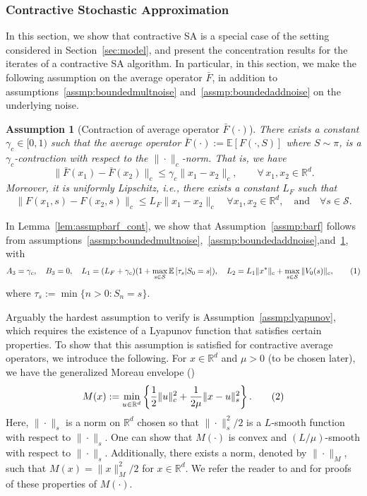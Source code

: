 \documentclass{article}
\newcommand{\numberthis}{\addtocounter{equation}{1}\tag{\theequation}}
\newcommand{\lrset}[1]{\left\{ #1 \right\}}
\newcommand{\lrs}[1]{\left[ #1 \right]}
\newcommand{\E}[1]{\mathbb{E}\lrs{#1}}
\newcommand{\R}{\mathbb{R}}
\newtheorem{assmp}{Assumption}
\begin{document}
\subsubsection{Contractive Stochastic Approximation}\label{sec:contractiveSA}
In this section, we show that contractive SA is a special case of the setting considered in Section~\ref{sec:model}, and present the concentration results for the iterates of a contractive SA algorithm. In particular, in this section, we make the following assumption on the average operator $\bar{F}$, in addition to assumptions~\ref{assmp:boundedmultnoise} and~\ref{assmp:boundedaddnoise} on the underlying noise. 

\begin{assmp}[Contraction of average operator $\bar{F}(\cdot)$]\label{assmp:contraction} There exists a constant $\gamma_c \in [0,1)$ such that the average operator $\bar{F}(\cdot) := \E{ F(\cdot,S)}$ where ${S\sim\pi}$, is a $\gamma_c$-contraction with respect to the $\|\cdot\|_c$-norm. That is, we have
    \[ \|\bar{F}(x_1) - \bar{F}(x_2)\|_c \le \gamma_c \|x_1 - x_2\|_c, \qquad \forall \, x_1, x_2 \in \R^d.  \]
Moreover, it is uniformly Lipschitz, i.e., there exists a constant $L_F$ such that 
\[ \|F(x_1, s) - F(x_2, s)\|_c \le L_F\|x_1 - x_2\|_c \quad \forall x_1, x_2 \in \R^d, \quad \text{and} \quad \forall s\in \mathcal S. \]
\end{assmp}

In Lemma~\ref{lem:assmpbarf_cont}, we show that Assumption~\ref{assmp:barf} follows from assumptions~\ref{assmp:boundedmultnoise},~\ref{assmp:boundedaddnoise},and~\ref{assmp:contraction}, with 
\begin{align*}
    A_3 = \gamma_c, \quad B_3 = 0, \quad L_1 = (L_F + \gamma_c)(1+\max_{s\in\mathcal S} \E{\tau_s | S_0 = s}), \quad L_2 = L_1 \|x^*\|_c + \max_{s\in\mathcal{S}} \|V_0(s)\|_c, \numberthis\label{eq:cont_const1}
\end{align*}
where $\tau_s := \min\{ n > 0: S_n = s \}$.

\medskip

Arguably the hardest assumption to verify is Assumption~\ref{assmp:lyapunov}, which requires the existence of a Lyapunov function that satisfies certain properties. To show that this assumption is satisfied for contractive average operators, we introduce the following. For $x\in\R^d$ and $\mu > 0$ (to be chosen later), we have the generalized Moreau envelope (\cite{beck2017first})
\[ M(x) := \min\limits_{u\in\R^d}\lrset{ \frac{1}{2}\|u\|^2_c + \frac{1}{2\mu} \|x-u\|^2_s }. \numberthis \label{eq:moreau} \]
Here, $\|\cdot\|_s$ is a norm on $\R^d$ chosen so that $\|\cdot\|^2_s/2$ is a $L$-smooth function with respect to $\|\cdot\|_s$. One can show that $M(\cdot)$ is convex and $(L/\mu)$-smooth with respect to $\|\cdot\|_s$. Additionally, there exists a norm, denoted by  $\|\cdot\|_M$, such that $M(x) = \|x\|^2_M/2$ for $x\in \R^d$. We refer the reader to \cite{beck2017first} and \cite[Lemma 2.1]{chen2020finite} for proofs of these properties of $M(\cdot)$. 
\end{document}
